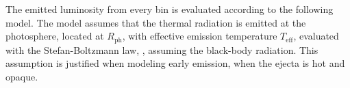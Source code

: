 The emitted luminosity from every bin is evaluated according to the following model. 
%
The model assumes that the thermal radiation is emitted at the photosphere, located at 
$R_{\text{ph}}$, with effective emission temperature $T_{\text{eff}}$, evaluated with the 
Stefan-Boltzmann law, \ie, assuming the black-body radiation. This assumption is justified 
when modeling early emission, when the ejecta is hot and opaque. 
%


